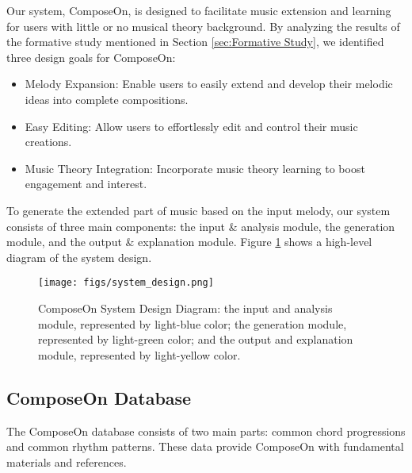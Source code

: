 Our system, ComposeOn, is designed to facilitate music extension and learning for users with little or no musical theory background. By analyzing the results of the formative study mentioned in Section \ref{sec:Formative Study}, we identified three design goals for ComposeOn:

\begin{itemize}
\item Melody Expansion: Enable users to easily extend and develop their melodic ideas into complete compositions.
\item Easy Editing: Allow users to effortlessly edit and control their music creations.
\item Music Theory Integration: Incorporate music theory learning to boost engagement and interest.
\end{itemize}

To generate the extended part of music based on the input melody, our system consists of three main components: the input \& analysis module, the generation module, and the output \& explanation module. Figure \ref{fig:system_design_diagram} shows a high-level diagram of the system design.
\begin{figure}[h]
\centering
\texttt{[image: figs/system\_design.png]}
\caption{ComposeOn System Design Diagram: the input and analysis module, represented by light-blue color; the generation module, represented by light-green color; and the output and explanation module, represented by light-yellow color.}
\label{fig:system_design_diagram}
\end{figure}

\subsection{ComposeOn Database}

The ComposeOn database consists of two main parts: common chord progressions and common rhythm patterns. These data provide ComposeOn with fundamental materials and references.

